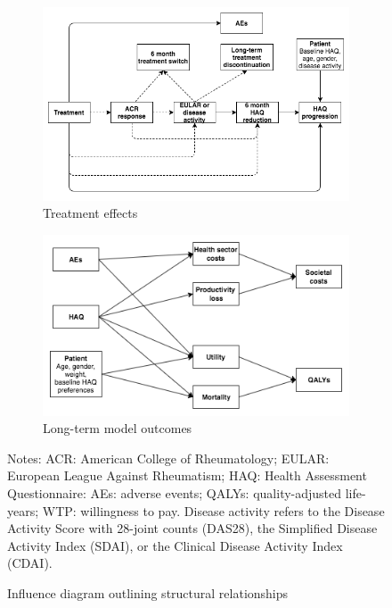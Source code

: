 \documentclass[11pt,final,fleqn]{article}\usepackage[]{graphicx}\usepackage[]{color}
\theoremstyle{plain}
\begin{document}
\begin{figure}
\centering
\begin{subfigure}{\textwidth}
\centering
\includegraphics[width=\textwidth]{influence-diagram-a.png}
\caption{Treatment effects} \label{subfig:treatment-effects}
\end{subfigure}
\begin{subfigure}{\textwidth}
\centering
\includegraphics[width=.8\textwidth]{influence-diagram-b.png}
\caption{Long-term model outcomes} \label{subfig:model-outcomes}
\end{subfigure}
\caption{Influence diagram outlining structural relationships}\label{fig:influence-diagram}
\begin{minipage}{\linewidth}
\footnotesize
Notes: ACR: American College of Rheumatology; EULAR: European League Against Rheumatism; HAQ: Health Assessment Questionnaire: AEs: adverse events; QALYs: quality-adjusted life-years; WTP: willingness to pay. Disease activity refers to the Disease Activity Score with 28-joint counts (DAS28), the Simplified Disease Activity Index (SDAI), or the Clinical Disease Activity Index (CDAI).
\end{minipage}
\end{figure}
\end{document}
